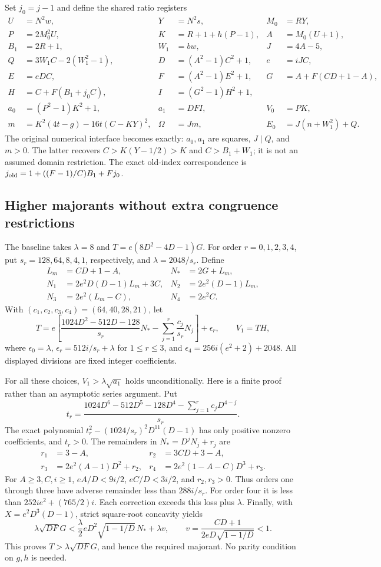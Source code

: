 Set \(j_0=j-1\) and define the shared ratio registers
\begin{align*}
 U&=N^2w,&Y&=N^2s,&M_0&=RY,\\
 P&=2M_0^2U,&K&=R+1+h(P-1),& A&=M_0(U+1),\\
 B_1&=2R+1,&W_1&=bw,&J&=4A-5,\\
 Q&=3W_1C-2(W_1^2-1),&D&=(A^2-1)C^2+1,&e&=iJC,\\
 E&=eDC,&F&=(A^2-1)E^2+1,&G&=A+F(CD+1-A),\\
 H&=C+F(B_1+j_0C),&I&=(G^2-1)H^2+1,&&\\
 a_0&=(P^2-1)K^2+1,&a_1&=DFI,&V_0&=PK,\\
 m&=K^2(4t-g)-16t(C-KY)^2,&\Omega&=Jm,&E_0&=J(n+W_1^2)+Q.
\end{align*}
The original numerical interface becomes exactly: \(a_0,a_1\) are
squares, \(J\mid Q\), and \(m>0\).  The latter recovers
\(C>K(Y-1/2)>K\) and \(C>B_1+W_1\); it is not an assumed domain restriction.
The exact old-index correspondence is
\(j_{\rm old}=1+((F-1)/C)B_1+Fj_0\).

\subsection{Higher majorants without extra congruence restrictions}
The baseline takes \(\lambda=8\) and
\(T=e(8D^2-4D-1)G\).  For order \(r=0,1,2,3,4\), put
\(s_r=128,64,8,4,1\), respectively, and \(\lambda=2048/s_r\).
Define
\begin{align*}
 L_m&=CD+1-A,&N_*&=2G+L_m,\\
 N_1&=2e^2D(D-1)L_m+3C,&N_2&=2e^2(D-1)L_m,\\
 N_3&=2e^2(L_m-C),&N_4&=2e^2C.
\end{align*}
With \((c_1,c_2,c_3,c_4)=(64,40,28,21)\), let
\[
 T=e\left[\frac{1024D^2-512D-128}{s_r}N_*
       -\sum_{j=1}^r\frac{c_j}{s_r}N_j\right]+\epsilon_r,
 \qquad V_1=TH,
\]
where \(\epsilon_0=\lambda\),
\(\epsilon_r=512i/s_r+\lambda\) for \(1\le r\le3\), and
\(\epsilon_4=256i(e^2+2)+2048\).
All displayed divisions are fixed integer coefficients.

For all these choices, \(V_1>\lambda\sqrt{a_1}\) holds unconditionally.
Here is a finite proof rather than an asymptotic series argument.  Put
\[
 t_r=\frac{1024D^6-512D^5-128D^4-
                 \sum_{j=1}^r c_jD^{4-j}}{s_r}.
\]
The exact polynomial
\(t_r^2-(1024/s_r)^2D^{11}(D-1)\) has only positive nonzero coefficients,
and \(t_r>0\).  The remainders in \(N_*=D^jN_j+r_j\) are
\begin{align*}
 r_1&=3-A,&r_2&=3CD+3-A,\\
 r_3&=2e^2(A-1)D^2+r_2,&r_4&=2e^2(1-A-C)D^3+r_3.
\end{align*}
For \(A\ge3,C,i\ge1\), \(eA/D<9i/2\), \(eC/D<3i/2\), and
\(r_2,r_3>0\).  Thus orders one through three have adverse remainder
less than \(288i/s_r\).  For order four it is less than
\(252ie^2+(765/2)i\).  Each correction exceeds this loss plus \(\lambda\).
Finally, with \(X=e^2D^3(D-1)\), strict square-root concavity yields
\[
 \lambda\sqrt{DF}G<\frac\lambda2 eD^2\sqrt{1-1/D}\,N_*+\lambda v,
 \qquad v=\frac{CD+1}{2eD\sqrt{1-1/D}}<1.
\]
This proves \(T>\lambda\sqrt{DF}G\), and hence the required majorant.
No parity condition on \(g,h\) is needed.

